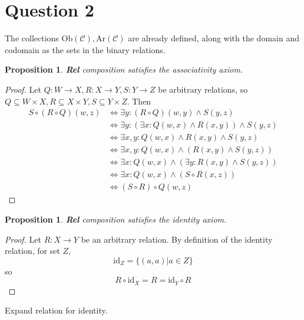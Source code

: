 \documentclass[11pt]{article} %
\newtheorem{proposition}[theorem]{Proposition}
\theoremstyle{definition}
\begin{document}
\clearpage
\section*{Question 2}
\addtocounter{section}{1}
The collections $\text{Ob}(\mathcal{C}),\text{Ar}(\mathcal{C})$ are already defined,
along with the domain and codomain as the sets in the binary relations.

\begin{proposition}
    \textbf{Rel} composition satisfies the associativity axiom.
\end{proposition}
\begin{proof}
    Let $Q:W\rightarrow X, R:X\rightarrow Y, S: Y\rightarrow Z$ be arbitrary relations, 
    so $Q\subseteq W\times X, R\subseteq X \times Y, S\subseteq Y \times Z$.
    Then 
    \begin{equation}
    \begin{aligned}
        S\circ (R\circ Q)(w, z) &\iff \exists y: (R\circ Q)(w,y) \wedge S (y, z)\\
        &\iff \exists y: (\exists x: Q(w,x) \wedge R(x,y)) \wedge S(y,z)\\
        &\iff \exists x,y: Q(w,x) \wedge R(x,y) \wedge S(y,z)\\
        &\iff \exists x,y: Q(w,x) \wedge (R(x,y) \wedge S(y,z))\\
        &\iff \exists x: Q(w,x) \wedge (\exists y: R(x,y) \wedge S(y,z))\\
        &\iff \exists x: Q(w,x) \wedge (S\circ R(x, z))\\
        &\iff (S\circ R) \circ Q(w,z)
    \end{aligned}
    \end{equation}
\end{proof}
\begin{proposition}
    \textbf{Rel} composition satisfies the identity axiom.
\end{proposition}
\begin{proof}
    Let $R: X\rightarrow Y$ be an arbitrary relation. By definition of the identity relation, for set $Z$,
    \[\text{id}_Z = \{(a,a)|a\in Z\}\]
    so
    \[R\circ\text{id}_X=R=\text{id}_Y\circ R\]
\end{proof}
{\color{teal}
Expand relation for identity.
}

\clearpage
\end{document}
